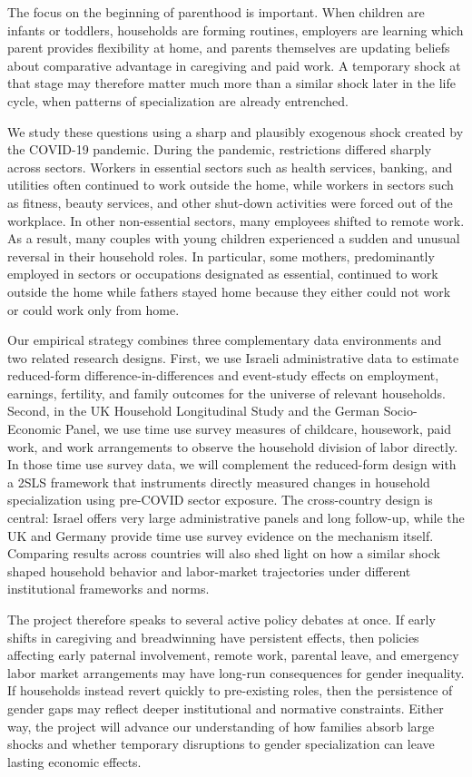 \documentclass[12pt]{article}
\begin{document}
The focus on the beginning of parenthood is important. When children are infants or toddlers, households are forming routines, employers are learning which parent provides flexibility at home, and parents themselves are updating beliefs about comparative advantage in caregiving and paid work. A temporary shock at that stage may therefore matter much more than a similar shock later in the life cycle, when patterns of specialization are already entrenched.

We study these questions using a sharp and plausibly exogenous shock created by the COVID-19 pandemic. During the pandemic, restrictions differed sharply across sectors. Workers in essential sectors such as health services, banking, and utilities often continued to work outside the home, while workers in sectors such as fitness, beauty services, and other shut-down activities were forced out of the workplace. In other non-essential sectors, many employees shifted to remote work. As a result, many couples with young children experienced a sudden and unusual reversal in their household roles. In particular, some mothers, predominantly employed in sectors or occupations designated as essential, continued to work outside the home while fathers stayed home because they either could not work or could work only from home.

Our empirical strategy combines three complementary data environments and two related research designs. First, we use Israeli administrative data to estimate reduced-form difference-in-differences and event-study effects on employment, earnings, fertility, and family outcomes for the universe of relevant households. Second, in the UK Household Longitudinal Study and the German Socio-Economic Panel, we use time use survey measures of childcare, housework, paid work, and work arrangements to observe the household division of labor directly. In those time use survey data, we will complement the reduced-form design with a 2SLS framework that instruments directly measured changes in household specialization using pre-COVID sector exposure. The cross-country design is central: Israel offers very large administrative panels and long follow-up, while the UK and Germany provide time use survey evidence on the mechanism itself. Comparing results across countries will also shed light on how a similar shock shaped household behavior and labor-market trajectories under different institutional frameworks and norms.

The project therefore speaks to several active policy debates at once. If early shifts in caregiving and breadwinning have persistent effects, then policies affecting early paternal involvement, remote work, parental leave, and emergency labor market arrangements may have long-run consequences for gender inequality. If households instead revert quickly to pre-existing roles, then the persistence of gender gaps may reflect deeper institutional and normative constraints. Either way, the project will advance our understanding of how families absorb large shocks and whether temporary disruptions to gender specialization can leave lasting economic effects.
\end{document}
